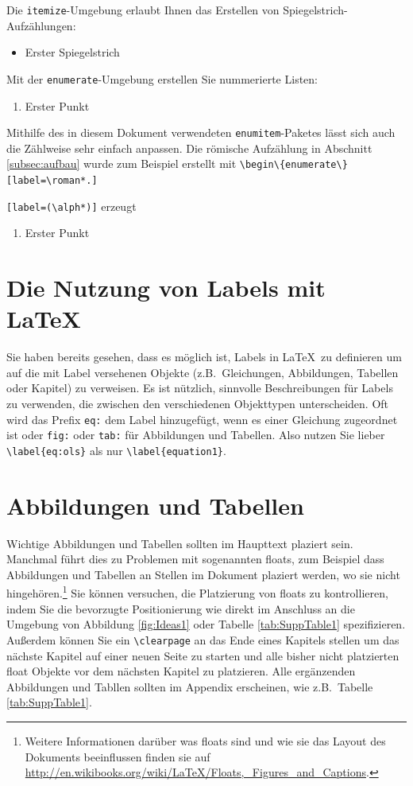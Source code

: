 \documentclass[a4paper,12pt]{scrartcl} %
\begin{document}
Die \texttt{itemize}-Umgebung erlaubt Ihnen das Erstellen von Spiegelstrich-Aufzählungen:

\begin{itemize}
  \item Erster Spiegelstrich
\end{itemize}
Mit der \texttt{enumerate}-Umgebung erstellen Sie nummerierte Listen:
\begin{enumerate}
  \item Erster Punkt
\end{enumerate}

Mithilfe des in diesem Dokument verwendeten \texttt{enumitem}-Paketes lässt sich auch die Zählweise sehr einfach anpassen. Die römische Aufzählung in Abschnitt \ref{subsec:aufbau} wurde zum Beispiel erstellt mit
\verb|\begin\{enumerate\}[label=\roman*.]|

\verb|[label=(\alph*)]| erzeugt
\begin{enumerate}[label=(\alph*)]
  \item Erster Punkt
\end{enumerate}

\clearpage


\section{Die Nutzung von Labels mit \LaTeX}

Sie haben bereits gesehen, dass es möglich ist, Labels in \LaTeX\ zu definieren um auf die mit Label versehenen Objekte (z.B.\ Gleichungen, Abbildungen, Tabellen oder Kapitel) zu verweisen. Es ist nützlich, sinnvolle Beschreibungen für Labels zu verwenden, die zwischen den verschiedenen Objekttypen unterscheiden. Oft wird das Prefix \texttt{eq:} dem Label hinzugefügt, wenn es einer Gleichung zugeordnet ist oder \texttt{fig:} oder \texttt{tab:} für Abbildungen und Tabellen. Also nutzen Sie lieber \verb|\label{eq:ols}| als nur \verb|\label{equation1}|.

\clearpage

\section{Abbildungen und Tabellen}

Wichtige Abbildungen und Tabellen sollten im Haupttext plaziert sein. Manchmal führt dies zu Problemen mit sogenannten floats, zum Beispiel dass Abbildungen und Tabellen an Stellen im Dokument plaziert werden, wo sie nicht hingehören.\footnote{Weitere Informationen darüber was floats sind und wie sie das Layout des Dokuments beeinflussen finden sie auf \url{http://en.wikibooks.org/wiki/LaTeX/Floats,_Figures_and_Captions}.} Sie können versuchen, die Platzierung von floats zu kontrollieren, indem Sie die bevorzugte Positionierung wie direkt im Anschluss an die Umgebung von Abbildung \ref{fig:Ideas1} oder Tabelle \ref{tab:SuppTable1} spezifizieren. Außerdem können Sie ein \verb|\clearpage| an das Ende eines Kapitels stellen um das nächste Kapitel auf einer neuen Seite zu starten und alle bisher nicht platzierten float Objekte vor dem nächsten Kapitel zu platzieren. Alle ergänzenden Abbildungen und Tabllen sollten im Appendix erscheinen, wie z.B.\ Tabelle \ref{tab:SuppTable1}.
\end{document}
